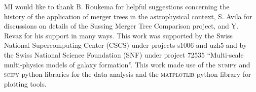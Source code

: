 MI would like  to thank B. Roukema for  helpful suggestions concerning
the history  of the application  of merger trees in  the astrophysical
context, S.   Avila for discussions  on details of the  Sussing Merger
Tree Comparison  project, and Y. Revaz for  his support in many  ways.  
This  work  was supported  by the  Swiss
National Supercomputing  Center (CSCS)  under projects s1006  and uzh5
and  by the  Swiss  National Science  Foundation  (SNF) under  project
72535 ``Multi-scale multi-physics models of galaxy formation''.  This
work        made        use        of        the        \textsc{numpy}
\citep{harrisArrayProgrammingNumPy2020}       and       \textsc{scipy}
\citep{virtanenSciPyFundamentalAlgorithms2020}  python  libraries  for
the      data      analysis      and      the      \textsc{matplotlib}
\citep{hunterMatplotlib2DGraphics2007}  python  library  for  plotting
tools.


